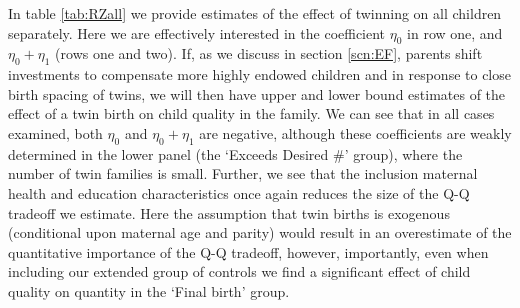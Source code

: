 \documentclass{article}[11pt,subeqn]
\begin{document}
\begin{spacing}{1.5}
In table \ref{tab:RZall} we provide estimates of the effect of twinning on all children separately.  Here we are effectively interested in the 
coefficient $\eta_0$ in row one, and $\eta_0+\eta_1$ (rows one and two).  If, as we discuss in section \ref{scn:EF}, parents shift investments
to compensate more highly endowed children and in response to close birth spacing of twins, we will then have upper and lower bound estimates
of the effect of a twin birth on child quality in the family.  We can see that in all cases examined, both $\eta_0$ and $\eta_0+\eta_1$ are negative,
although these coefficients are weakly determined in the lower panel (the `Exceeds Desired \#' group), where the number of twin families is small.
Further, we see that the inclusion maternal health and education characteristics once again reduces the size of the Q-Q tradeoff we estimate.  Here
the assumption that twin births is exogenous (conditional upon maternal age and parity) would result in an overestimate of the quantitative importance
of the Q-Q tradeoff, however, importantly, even when including our extended group of controls we find a significant effect of child quality on quantity
in the `Final birth' group.


\end{spacing}
\end{document}
